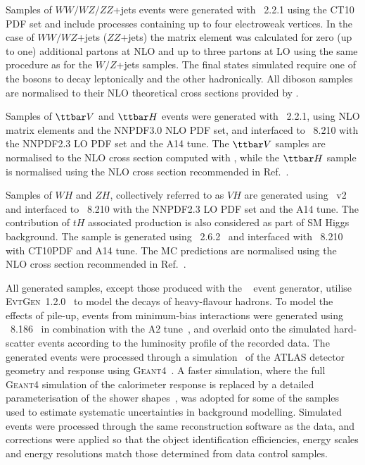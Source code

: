 Samples of $WW/WZ/ZZ$+jets events were generated with {\sherpa}~2.2.1 using the CT10 PDF set
and include processes containing up to four electroweak vertices. 
In the case of $WW/WZ$+jets ($ZZ$+jets) the matrix element was calculated for zero (up to one) additional partons 
at NLO and up to three partons at LO using the same procedure as for the $W/Z$+jets samples. 
The final states simulated require one of the bosons to decay leptonically and the other hadronically.
All diboson samples are normalised to their NLO theoretical cross sections provided by {\sherpa}. 

Samples of $\ttbar V$ and $\ttbar H$ events were generated with {\amcatnlo}~2.2.1, using NLO matrix elements and the NNPDF3.0 NLO PDF set,
and interfaced to {\pythia}~8.210 with the NNPDF2.3 LO PDF set and the A14 tune. 
The $\ttbar V$ samples are normalised to the NLO cross section computed with {\amcatnlo}, while the $\ttbar H$ sample is normalised using 
the NLO cross section recommended in Ref.~\cite{deFlorian:2016spz}.

Samples of $WH$ and $ZH$, collectively referred to as $VH$ are generated using {\powheg}~v2 \cite{Frixione:2007nw,Nason:2004rx,Frixione:2007vw,Alioli:2010xd}
and interfaced to {\pythia}~8.210 with the NNPDF2.3 LO PDF set and the A14 tune.
The contribution of $tH$ associated production is also considered as part of SM Higgs background.
The sample is generated using {\amcatnlolong}~2.6.2~\cite{Alwall:2014hca} and interfaced with {\pythia}~8.210 with CT10PDF
and A14 tune. The MC predictions are normalised using the NLO cross section recommended in Ref.~\cite{deFlorian:2016spz}. 

All generated samples, except those produced with the {\sherpa}~\cite{Gleisberg:2008ta} event generator, 
utilise \textsc{EvtGen}~1.2.0~\cite{Lange:2001uf} to model the decays of heavy-flavour hadrons. 
To model the effects of pile-up, events from minimum-bias interactions were generated using {\pythia}~8.186~\cite{Sjostrand:2007gs}  
in combination with the A2 tune~\cite{ATL-PHYS-PUB-2011-014}, 
and overlaid onto the simulated hard-scatter events according to the luminosity profile of the recorded data. 
The generated events were processed through a simulation~\cite{Aad:2010ah} of the ATLAS detector geometry and response 
using \textsc{Geant4}~\cite{Agostinelli:2002hh}. A faster simulation, where the full \textsc{Geant4} simulation of
the calorimeter response is replaced by a detailed parameterisation of the shower shapes~\cite{FastCaloSim},
was adopted for some of the samples used to estimate systematic uncertainties in background modelling.
Simulated events were processed through the same reconstruction software as the data, and corrections were applied so that the object identification 
efficiencies, energy scales and energy resolutions match those determined from data control samples.


